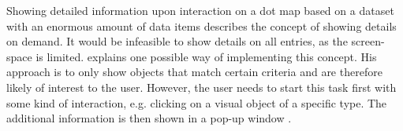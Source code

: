 Showing detailed information upon interaction on a dot map based on a dataset with an enormous amount of data items describes the concept of showing details on demand. It would be infeasible to show details on all entries, as the screen-space is limited.
\citeauthor{Ahlberg:1996} explains one possible way of implementing this concept. His approach is to only show objects that match certain criteria and are therefore likely of interest to the user. However, the user needs to start this task first with some kind of interaction, e.g. clicking on a visual object of a specific type. The additional information is then shown in a pop-up window .

